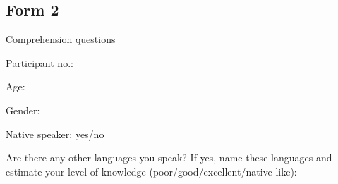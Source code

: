\documentclass[output=paper]{langsci/langscibook}
\begin{document}
\begin{paperappendix}

\subsection{Form 2}
Comprehension questions%
{\small

\noindent Participant no.: \underline{\hphantom{3em}}

\noindent Age: \underline{\hphantom{3em}}

\noindent Gender: \underline{\hphantom{3em}}

\noindent Native  speaker: yes/no

\noindent Are there any other languages you speak? If yes, name these languages and estimate your level of knowledge (poor/good/excellent/native-like): \underline{\hphantom{3em}}

}
\end{paperappendix}
\end{document}
